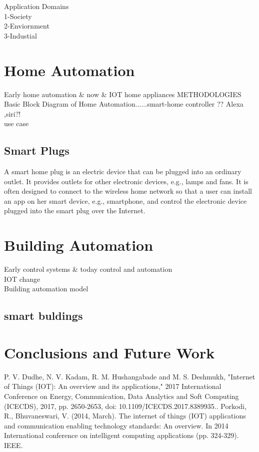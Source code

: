 \documentclass[conference]{IEEEtran}
\begin{document}
Application Domains
\\
1-Society  \\
2-Enviornment \\
3-Industial \\

\cite{AppOverview}
\cite{Domain}


\section{Home Automation}
 
Early home automation  \& now \& IOT home appliances 
METHODOLOGIES 
Basic Block Diagram of Home Automation......smart-home controller ?? Alexa ,siri?!
\\use case 

\subsection{Smart Plugs}

A smart home plug is an electric device that can be plugged
into an ordinary outlet. It provides outlets for other electronic
devices, e.g., lamps and fans. It is often designed to connect to
the wireless home network so that a user can install an app on
her smart device, e.g., smartphone, and control the electronic
device plugged into the smart plug over the Internet.

\section{Building  Automation }

Early control systems \& today control and automation \\ IOT change \\

Building automation model

\subsection{smart buldings}

\section{Conclusions and Future Work }



\begin{thebibliography}{00}
	
	
 P. V. Dudhe, N. V. Kadam, R. M. Hushangabade and M. S. Deshmukh, "Internet of Things (IOT): An overview and its applications," 2017 International Conference on Energy, Communication, Data Analytics and Soft Computing (ICECDS), 2017, pp. 2650-2653, doi: 10.1109/ICECDS.2017.8389935..
  Porkodi, R.,  Bhuvaneswari, V. (2014, March). The internet of things (IOT) applications and communication enabling technology standards: An overview. In 2014 International conference on intelligent computing applications (pp. 324-329). IEEE.

\end{thebibliography}
\end{document}
